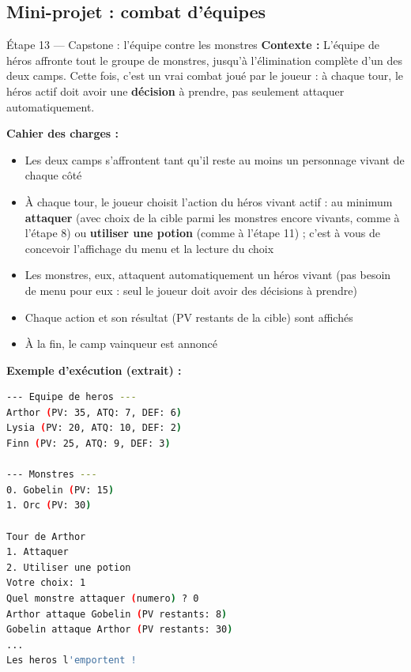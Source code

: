 \subsection{Mini-projet : combat d'équipes}

\begin{UPSTIManipulation}{Étape 13 — Capstone : l'équipe contre les monstres}
  \textbf{Contexte :} L'équipe de héros affronte tout le groupe de monstres, jusqu'à
  l'élimination complète d'un des deux camps. Cette fois, c'est un vrai combat joué par le
  joueur : à chaque tour, le héros actif doit avoir une \textbf{décision} à prendre, pas
  seulement attaquer automatiquement.

  \textbf{Cahier des charges :}
  \begin{itemize}
    \item Les deux camps s'affrontent tant qu'il reste au moins un personnage vivant de chaque
      côté
    \item À chaque tour, le joueur choisit l'action du héros vivant actif : au minimum
      \textbf{attaquer} (avec choix de la cible parmi les monstres encore vivants, comme à
      l'étape 8) ou \textbf{utiliser une potion} (comme à l'étape 11) ; c'est à vous de
      concevoir l'affichage du menu et la lecture du choix
    \item Les monstres, eux, attaquent automatiquement un héros vivant (pas besoin de menu pour
      eux : seul le joueur doit avoir des décisions à prendre)
    \item Chaque action et son résultat (PV restants de la cible) sont affichés
    \item À la fin, le camp vainqueur est annoncé
  \end{itemize}

  \textbf{Exemple d'exécution (extrait) :}
  \begin{lstlisting}[language=bash]
--- Equipe de heros ---
Arthor (PV: 35, ATQ: 7, DEF: 6)
Lysia (PV: 20, ATQ: 10, DEF: 2)
Finn (PV: 25, ATQ: 9, DEF: 3)

--- Monstres ---
0. Gobelin (PV: 15)
1. Orc (PV: 30)

Tour de Arthor
1. Attaquer
2. Utiliser une potion
Votre choix: 1
Quel monstre attaquer (numero) ? 0
Arthor attaque Gobelin (PV restants: 8)
Gobelin attaque Arthor (PV restants: 30)
...
Les heros l'emportent !
  \end{lstlisting}

\end{UPSTIManipulation}

